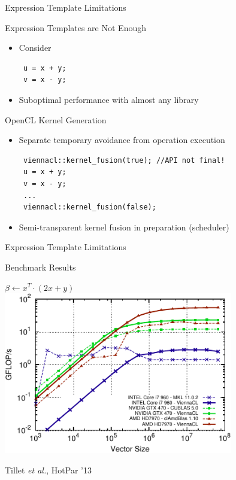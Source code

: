 \begin{frame}[fragile]{Expression Template Limitations}

 \begin{block}{Expression Templates are Not Enough}
  \begin{itemize}
   \item Consider
    \begin{lstlisting}
 u = x + y;
 v = x - y;
    \end{lstlisting}
   \item Suboptimal performance with almost any library
  \end{itemize}
 \end{block}

 \begin{block}{OpenCL Kernel Generation}
   \begin{itemize}
    \item Separate temporary avoidance from operation execution
    \begin{lstlisting}
 viennacl::kernel_fusion(true); //API not final!
 u = x + y;
 v = x - y;
 ...
 viennacl::kernel_fusion(false);
    \end{lstlisting}
    \item Semi-transparent kernel fusion in preparation (scheduler)
   \end{itemize}
 \end{block}
\end{frame}


\begin{frame}{Expression Template Limitations}

 \begin{block}{Benchmark Results}
  \begin{center}
   $\beta \leftarrow x^T \cdot (2x + y)$ \\
   \includegraphics[width=0.75\textwidth]{figures/daxpy_ddot.pdf} \\
  \end{center}
   \scriptsize Tillet \textit{et al.}, HotPar '13

 \end{block}

\end{frame}
